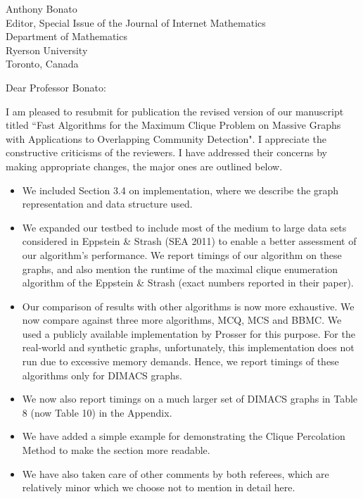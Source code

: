 \begin{letter}{
Anthony Bonato \\
Editor, Special Issue of the Journal of Internet Mathematics  \\
Department of Mathematics \\
Ryerson University \\
Toronto, Canada
}

\opening{Dear Professor Bonato:}

I am pleased to resubmit for publication the revised version of our manuscript titled ``Fast Algorithms for the Maximum Clique Problem on Massive Graphs with Applications to Overlapping Community Detection". I appreciate the constructive criticisms of the reviewers. I have addressed their concerns by making appropriate changes, the major ones are outlined below.

\begin{itemize}
\item We included Section 3.4 on implementation, where we describe the graph representation and data structure used.
\item We expanded our testbed to include most of the medium to large data sets considered in Eppstein \& Strash (SEA 2011) to enable a better assessment of our algorithm's performance. We report timings of our algorithm on these graphs, and also mention the runtime of the maximal clique enumeration algorithm of the Eppstein \& Strash (exact numbers reported in their paper).
\item Our comparison of results with other algorithms is now more exhaustive. We now compare against three more algorithms, MCQ, MCS and BBMC. We used a publicly available implementation by Prosser for this purpose. For the real-world and synthetic graphs, unfortunately, this implementation does not run due to excessive memory demands. Hence, we report timings of these algorithms only for DIMACS graphs. 
\item We now also report timings on a much larger set of DIMACS graphs in Table 8 (now Table 10) in the Appendix.
\item We have added a simple example for demonstrating the Clique Percolation Method to make the section more readable.
\item We have also taken care of other comments by both referees, which are relatively minor which we choose not to mention in detail here.
\end{itemize}



\end{letter}
